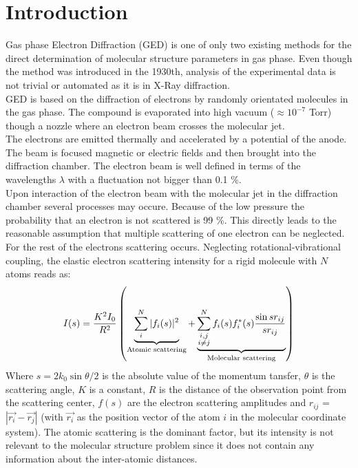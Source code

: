 \section{Introduction}
Gas phase Electron Diffraction  (GED) is one of only two existing methods for the direct determination of molecular structure parameters in gas phase. Even though the method  was introduced in the 1930th, analysis of the experimental data is not trivial or automated as it is in X-Ray diffraction.\\ 
GED is based on the diffraction of electrons by randomly orientated molecules in the gas phase. The compound is evaporated into high vacuum ($\approx 10^{-7}$ Torr) though a nozzle where an electron beam crosses the molecular jet.\\
The electrons are emitted thermally and accelerated by a potential of the anode.  The beam is focused magnetic or electric fields and then brought into the diffraction chamber. The electron beam is well defined in terms of the wavelengths $\lambda$ with a fluctuation not bigger than 0.1 \%. \\
Upon interaction of the electron beam with the molecular jet in the diffraction chamber  several processes may occure. Because of the low pressure the probability that an electron is not scattered is 99 \%. This directly leads to the reasonable assumption that multiple scattering of one electron can be neglected. \\
For the rest of the electrons scattering occurs.  Neglecting rotational-vibrational coupling, the elastic electron scattering intensity for a rigid molecule with $N$ atoms reads as: 
\begin{equation*}
I(s) = \frac{K^2I_0}{R^2}\left(  \underbrace{\sum_i^N |f_i(s)|^2}_{\textnormal{Atomic scattering}} +  \underbrace{\sum^N_{ \substack{i,j \\ i\neq j}}f_i(s)f_i^*(s) \frac{\sin sr_{ij}}{sr_{ij}}}_{\textnormal{Molecular scattering}} \right)
\end{equation*}
Where $s = 2 k_0 \sin \theta/2$ is the absolute value of the momentum tansfer, $\theta$ is the scattering angle, $K$ is a constant, $R$ is the distance of the observation point from the scattering center, $f(s)$ are the electron scattering amplitudes and $r_{ij}$ = $|\vec{r_i}-\vec{r_j}|$ (with $\vec{r_i}$ as the position vector of the atom $i$ in the molecular coordinate system). The atomic scattering is the dominant factor, but its intensity is not relevant to the molecular structure problem since it does not contain any information about the inter-atomic distances.  \\
